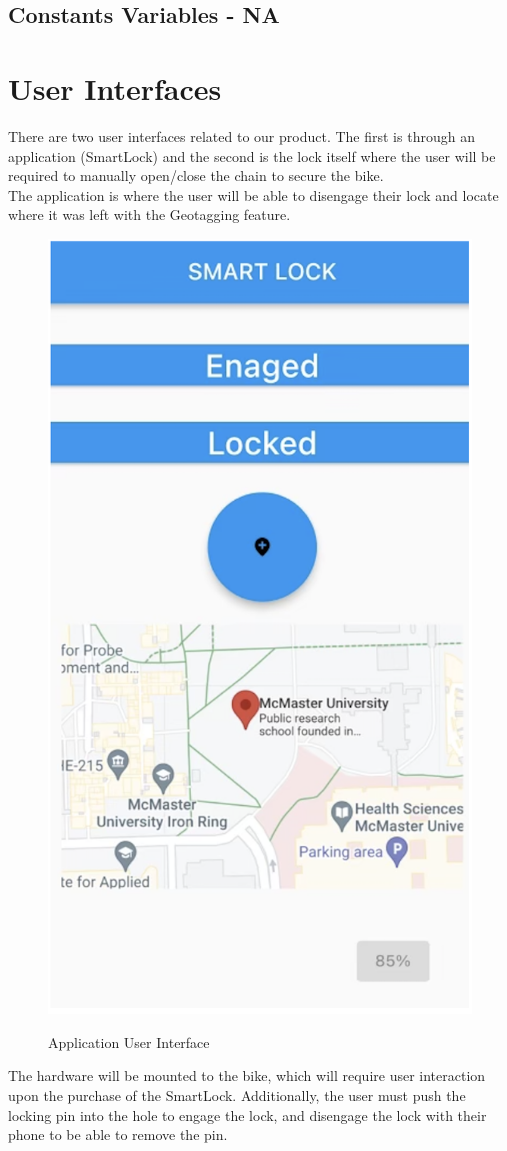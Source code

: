\documentclass[12pt, titlepage]{article}
\begin{document}
\subsection{Constants Variables - NA}

\newpage
\section{User Interfaces}
There are two user interfaces related to our product. The first is through an application (SmartLock) and the second is the lock itself where the user will be required to manually open/close the chain to secure the bike. \\


The application is where the user will be able to disengage their lock and locate where it was left with the Geotagging feature. \\

 \begin{figure}[h!]
 \begin{center}
 {
  \includegraphics[width=0.5\linewidth]{UI.png}
 }
 \caption{\label{Application User Interface} Application User Interface}
 \end{center}
 \end{figure}

\newpage
The hardware will be mounted to the bike, which will require user interaction upon the purchase of the SmartLock. Additionally, the user must push the locking pin into the hole to engage the lock, and disengage the lock with their phone to be able to remove the pin. 
\end{document}
